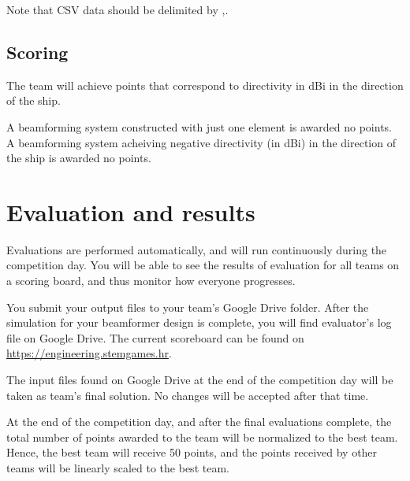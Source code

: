 \documentclass{article}[a4paper]
\begin{document}
Note that CSV data should be delimited by \textsf{,}.

\subsection*{Scoring}

The team will achieve points that correspond to directivity in dBi in the direction of the ship.

A beamforming system constructed with just one element is awarded no points. A beamforming system acheiving negative directivity (in dBi) in the direction of the ship is awarded no points.

\section*{Evaluation and results}

Evaluations are performed automatically, and will run continuously during the competition day. You will be able to see the results of evaluation for all teams on a scoring board, and thus monitor how everyone progresses.

You submit your output files to your team's Google Drive folder.
After the simulation for your beamformer design is complete, you will find evaluator's log file on Google Drive.
The current scoreboard can be found on \url{https://engineering.stemgames.hr}.

The input files found on Google Drive at the end of the competition day will be taken as team's final solution. No changes will be accepted after that time.

At the end of the competition day, and after the final evaluations complete, the total number of points awarded to the team will be normalized to the best team. Hence, the best team will receive 50 points, and the points received by other teams will be linearly scaled to the best team.
\end{document}
